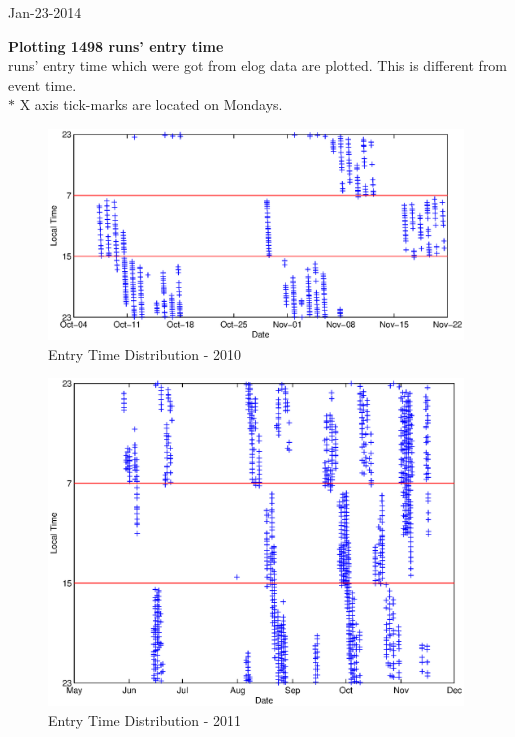 \documentclass[a4paper,11pt]{article}
\begin{document}
\pagestyle{empty}

\begin{rightline}
{Jan-23-2014}
\end{rightline}
\noindent
\textbf{Plotting 1498 runs' entry time}\\

 runs' entry time which were got from elog data are plotted.
This is different from event time.\\

\noindent
$\ast$ X axis tick-marks are located on Mondays.

\begin{figure}[htbp]
\begin{center}
\includegraphics[width =11cm]{PlotTime2010.eps}
\caption{Entry Time Distribution - 2010}
\end{center}
\label{2010}
\end{figure}

\begin{figure}[htbp]
\begin{center}
\includegraphics[width =11cm]{PlotTime2011.eps}
\caption{Entry Time Distribution - 2011}
\end{center}
\label{2011}
\end{figure}
\end{document}
